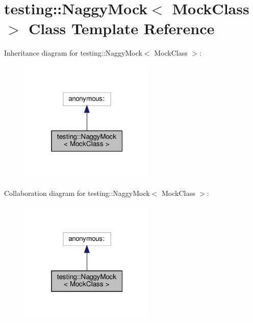 \hypertarget{classtesting_1_1_naggy_mock}{}\section{testing\+:\+:Naggy\+Mock$<$ Mock\+Class $>$ Class Template Reference}
\label{classtesting_1_1_naggy_mock}


Inheritance diagram for testing\+:\+:Naggy\+Mock$<$ Mock\+Class $>$\+:
\nopagebreak
\begin{figure}[H]
\begin{center}
\leavevmode
\includegraphics[width=184pt]{classtesting_1_1_naggy_mock__inherit__graph}
\end{center}
\end{figure}


Collaboration diagram for testing\+:\+:Naggy\+Mock$<$ Mock\+Class $>$\+:
\nopagebreak
\begin{figure}[H]
\begin{center}
\leavevmode
\includegraphics[width=184pt]{classtesting_1_1_naggy_mock__coll__graph}
\end{center}
\end{figure}
